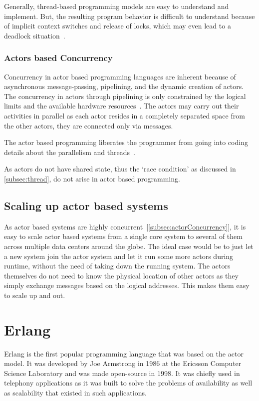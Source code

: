   Generally, thread-based programming models are easy to understand and implement. But, the resulting program behavior is difficult to understand because of implicit context switches and release of locks, which may even lead to a deadlock situation~\cite{ambientTalk}.

\subsubsection{Actors based Concurrency}
\label{subsec:actorConcurrency}
  Concurrency in actor based programming languages are inherent because of asynchronous message-passing, pipelining, and the dynamic creation of actors. The concurrency in actors through pipelining is only constrained by the logical limits and the available hardware resources~\cite{agha}. The actors may carry out their activities in parallel as each actor resides in a completely separated space from the other actors, they are connected only via messages.

  The actor based programming liberates the programmer from going into coding details about the parallelism and threads~\cite{agha}.

  As actors do not have shared state, thus the ‘race condition’ as discussed in \autoref{subsec:thread}, do not arise in actor based programming.

\subsection{Scaling up actor based systems}
  As actor based systems are highly concurrent~[\autoref{subsec:actorConcurrency}], it is easy to scale actor based systems from a single core system to several of them across multiple data centers around the globe. The ideal case would be to just let a new system join the actor system and let it run some more actors during runtime, without the need of taking down the running system. The actors themselves do not need to know the physical location of other actors as they simply exchange messages based on the logical addresses. This makes them easy to scale up and out.

\section{Erlang}
\label{sec:erlang}
  Erlang is the first popular programming language that was based on the actor model\cite{vinoski}. It was developed by Joe Armstrong in 1986 at the Ericsson Computer Science Laboratory and was made open-source in 1998. It was chiefly used in telephony applications as it was built to solve the problems of availability as well as scalability that existed in such applications.~\parencite{armstrong}

